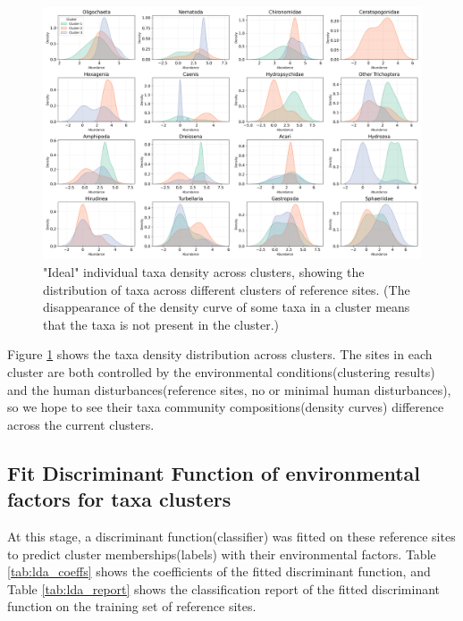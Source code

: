 \begin{figure}[!h]
    \centering
    \includegraphics[width=\textwidth]{../results/preliminary_results/taxa_density_by_cluster.png}
    \caption{"Ideal" individual taxa density across clusters, showing the distribution of taxa across different clusters of reference sites.
    (The disappearance of the density curve of some taxa in a cluster means that the taxa is not present in the cluster.)}
    \label{fig:taxa_density_by_cluster}
\end{figure}

Figure \textcolor{blue}{\ref{fig:taxa_density_by_cluster}} shows the taxa density distribution across clusters.
The sites in each cluster are both controlled by the environmental conditions(clustering results)
and the human disturbances(reference sites, no or minimal human disturbances), 
so we hope to see their taxa community compositions(density curves) difference across 
the current clusters.

\subsection{Fit Discriminant Function of environmental factors for taxa clusters}

At this stage, a discriminant function(classifier) was fitted on these reference sites to 
predict cluster memberships(labels) with their environmental factors.
Table \textcolor{blue}{\ref{tab:lda_coeffs}} shows the coefficients of the fitted discriminant function,
and Table \textcolor{blue}{\ref{tab:lda_report}} shows the classification report of the fitted discriminant function
on the training set of reference sites.

